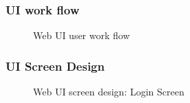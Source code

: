 
\topmargin=-0.45in
\evensidemargin=0in
\oddsidemargin=0in
\textwidth=6.5in
\textheight=9.0in
\headsep=0.25in

\linespread{1.1} %

\subsubsection{UI work flow}

\begin{figure}[H]
\centering	
{}
\caption{Web UI user work flow}
\end{figure}

\subsubsection{UI Screen Design}

\begin{figure}[H]
\centering	
{}
\caption{Web UI screen design: Login Screen}
\end{figure}

